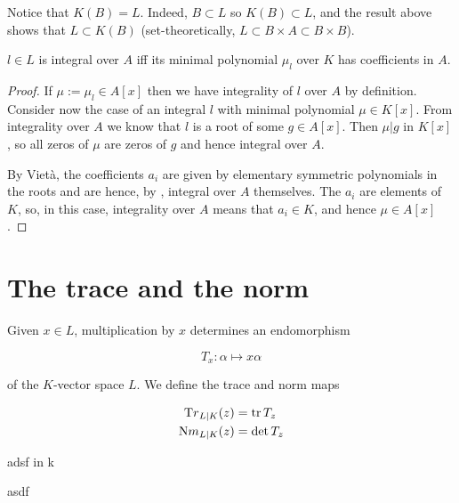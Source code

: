 \documentclass{memoir}
\begin{document}
\begin{remark}
  Notice that $K(B) = L$. Indeed, $B \subset L$ so $K(B) \subset L$, and the
  result above shows that $L \subset K(B)$ (set-theoretically, $L \subset B
  \times A \subset B \times B$).
\end{remark}

\begin{theorem}
  $l \in L$ is integral over $A$ iff its minimal polynomial $\mu_l$ over $K$ has
  coefficients in $A$.
\end{theorem}

\begin{proof}
  If $\mu := \mu_l \in A[x]$ then we have integrality of $l$ over $A$ by
  definition. Consider now the case of an integral $l$ with minimal polynomial
  $\mu \in K[x]$. From integrality over $A$ we know that $l$ is a root of some
  $g \in A[x]$. Then $\mu | g$ in $K[x]$, so all zeros of $\mu$ are zeros of $g$
  and hence integral over $A$.

  \npar By Viet\`a, the coefficients $a_i$ are given by elementary symmetric
  polynomials in the roots and are hence, by
  , integral over $A$ themselves. The $a_i$
  are elements of $K$, so, in this case, integrality over $A$ means that $a_i
  \in K$, and hence $\mu \in A[x]$.
\end{proof}

\section{The trace and the norm}

Given $x \in L$, multiplication by $x$ determines an endomorphism

\[ T_x : \alpha \mapsto x\alpha \]

of the $K$-vector space $L$. We define the trace and norm maps

\noindent
\begin{align*}
{\mathrm Tr}_{L|K}(z) &= \operatorname{tr} T_z\\
{\mathrm Nm}_{L|K}(z) &= \det T_z
\end{align*}
\begin{theorem}
  adsf in  k
\end{theorem}

asdf
\end{document}
